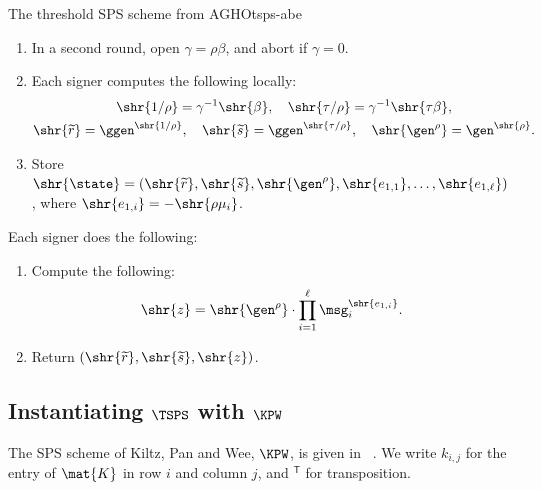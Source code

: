 \begin{protocolbox}{The threshold SPS scheme from AGHO}{tsps-abe}
\begin{description}
\begin{enumerate}
	\item In a second round, open $\gamma = \rho\beta$, and abort if $\gamma
= 0$.

	\item Each signer computes the following locally:
	  \begin{gather*}
	    \shr{1/\rho} = \gamma^{-1}\shr{\beta}, \quad \shr{\tau/\rho} =
\gamma^{-1}\shr{\tau\beta}, \\
	    \shr{\widetilde{r}} = \ggen^{\shr{1/\rho}}, \quad \shr{\widetilde{s}}
= \ggen^{\shr{\tau/\rho}}, \quad \shr{\gen^{\rho}} = \gen^{\shr{\rho}}.
	  \end{gather*}

	\item Store $\shr{\state} = (\shr{\widetilde{r}}, \shr{\widetilde{s}},
\shr{\gen^{\rho}}, \shr{e_{1,1}}, \ldots, \shr{e_{1,\ell}})$, where
$\shr{e_{1,i}} = -\shr{\rho\mu_i}$.

      \end{enumerate}

    \item[$\SPSsig_h \leftarrow \TSPSonsign(\sk_h, \state_h, \vec{\msg})$ :]
Each signer does the following:

      \begin{enumerate}

	\item Compute the following:
	  \begin{equation*}
	    \shr{z} = \shr{\gen^{\rho}} \cdot \prod_{i=1}^\ell
\msg_i^{\shr{e_{1,i}}}.
	  \end{equation*}

	\item Return $(\shr{\widetilde{r}}, \shr{\widetilde{s}}, \shr{z})$.

      \end{enumerate}

  \end{description}

\end{protocolbox}

\subsection{Instantiating $\TSPS$ with $\KPW$}\label{sec:tsps-kiltz}

The SPS scheme of Kiltz, Pan and Wee, $\KPW$, is given in
~\cite{C:KilPanWee15}. We write $k_{i,j}$ for the entry of
$\mat{K}$ in row $i$ and column $j$, and ${}^{\mathsf{T}}$ for transposition.

